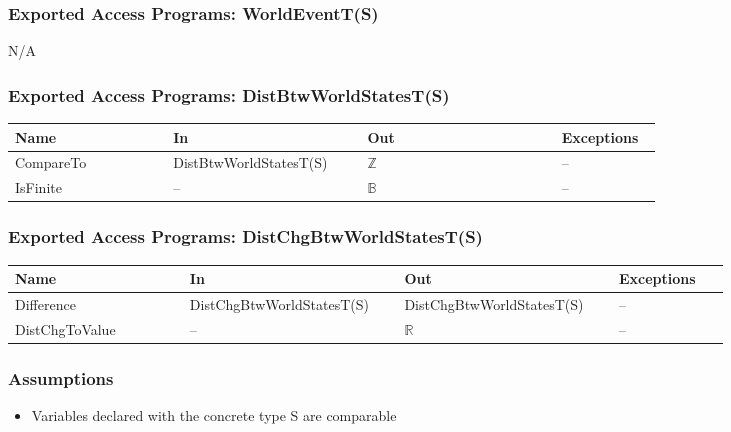 \subsubsection{Exported Access Programs: WorldEventT(S)}

N/A

\subsubsection{Exported Access Programs: DistBtwWorldStatesT(S)}

\begin{center}
    \renewcommand{\arraystretch}{1.1}
    \begin{tabular}{m{0.22\linewidth} m{0.27\linewidth}m{0.27\linewidth}
            m{0.14\linewidth}}
        \toprule
        \textbf{Name} & \textbf{In} & \textbf{Out} & \textbf{Exceptions} \\
        \midrule

        \rowcolor[gray]{0.9}CompareTo & DistBtwWorldStatesT(S) & $\mathbb{Z}$
        & -- \\

        IsFinite & -- & $\mathbb{B}$ & -- \\

        \bottomrule
    \end{tabular}
\end{center}

\subsubsection{Exported Access Programs: DistChgBtwWorldStatesT(S)}

\begin{center}
    \renewcommand{\arraystretch}{1.1}
    \begin{tabular}{m{0.22\linewidth} m{0.27\linewidth}m{0.27\linewidth}
            m{0.14\linewidth}}
        \toprule
        \textbf{Name} & \textbf{In} & \textbf{Out} & \textbf{Exceptions} \\
        \midrule

        \rowcolor[gray]{0.9}Difference & DistChgBtwWorldStatesT(S) &
        DistChgBtwWorldStatesT(S) & -- \\

        DistChgToValue & -- & $\mathbb{R}$ & -- \\

        \bottomrule
    \end{tabular}
\end{center}

\subsubsection{Assumptions}
\begin{itemize}

    \item Variables declared with the concrete type S are comparable

\end{itemize}